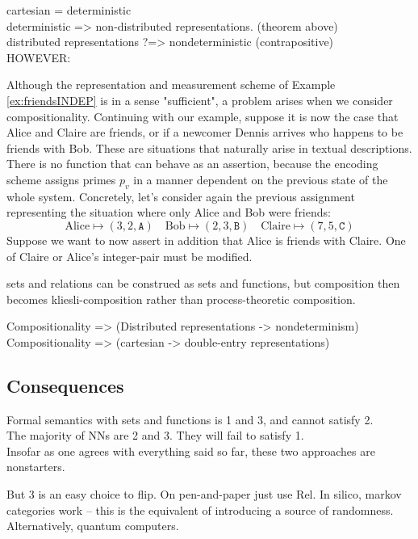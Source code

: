 \begin{lemma}

\end{lemma}

\begin{lemma}[]

\end{lemma}

cartesian = deterministic\\

deterministic => non-distributed representations. (theorem above)\\

distributed representations ?=> nondeterministic (contrapositive)\\

HOWEVER:

\begin{example}\label{ex:friendsINDEP2}
Although the representation and measurement scheme of Example \ref{ex:friendsINDEP} is in a sense "sufficient", a problem arises when we consider compositionality. Continuing with our example, suppose it is now the case that Alice and Claire are friends, or if a newcomer Dennis arrives who happens to be friends with Bob. These are situations that naturally arise in textual descriptions. There is no function that can behave as an assertion, because the encoding scheme assigns primes $p_v$ in a manner dependent on the previous state of the whole system. Concretely, let's consider again the previous assignment representing the situation where only Alice and Bob were friends:
\[\text{Alice} \mapsto (3,2,\texttt{A}) \quad \text{Bob} \mapsto (2,3,\texttt{B}) \quad \text{Claire} \mapsto (7,5,\texttt{C})\]
Suppose we want to now assert in addition that Alice is friends with Claire. One of Claire or Alice's integer-pair must be modified.


sets and relations can be construed as sets and functions, but composition then becomes kliesli-composition rather than process-theoretic composition.
\end{example}

Compositionality => (Distributed representations -> nondeterminism)
Compositionality => (cartesian -> double-entry representations)

\subsection{Consequences}

Formal semantics with sets and functions is 1 and 3, and cannot satisfy 2.\\
The majority of NNs are 2 and 3. They will fail to satisfy 1.\\
Insofar as one agrees with everything said so far, these two approaches are nonstarters.

But 3 is an easy choice to flip. On pen-and-paper just use Rel. In silico, markov categories work -- this is the equivalent of introducing a source of randomness. Alternatively, quantum computers.

